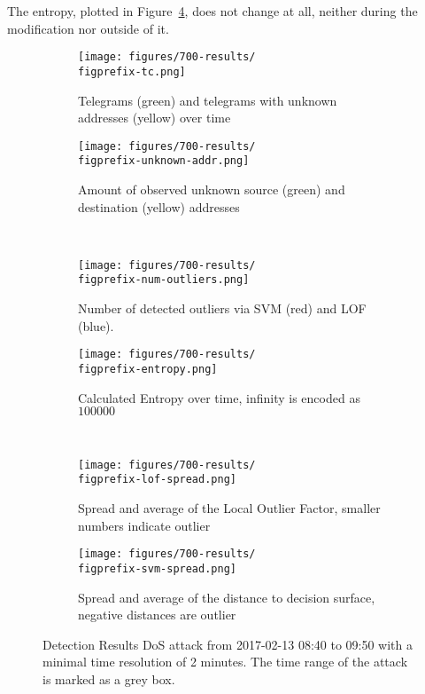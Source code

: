 The entropy, plotted in Figure~\ref{fig:results:dos:entropy}, does not change at all, neither during the modification nor outside of it.

\begin{figure}[H]
	\newcommand{\figwith}{0.49\textwidth}
	\newcommand{\figprefix}{dos}
	\centering
	
	\begin{subfigure}[b]{\figwith}
		\texttt{[image: figures/700-results/\\figprefix-tc.png]}
		\caption{Telegrams (green) and telegrams with unknown addresses (yellow) over time}
		\label{fig:results:\figprefix:tc}
	\end{subfigure}
	\hfil
	\begin{subfigure}[b]{\figwith}
		\texttt{[image: figures/700-results/\\figprefix-unknown-addr.png]}
		\caption{Amount of observed unknown source (green) and destination (yellow) addresses}
		\label{fig:results:\figprefix:addr}
	\end{subfigure}
	\\[1.5mm]
	\begin{subfigure}[b]{\figwith}
		\texttt{[image: figures/700-results/\\figprefix-num-outliers.png]}
		\caption{Number of detected outliers via SVM (red) and LOF (blue).}
		\label{fig:results:\figprefix:outlier}
	\end{subfigure}
	\hfil
	\begin{subfigure}[b]{\figwith}
		\texttt{[image: figures/700-results/\\figprefix-entropy.png]}
		\caption{Calculated Entropy over time, infinity is encoded as $100 000$}
		\label{fig:results:\figprefix:entropy}
	\end{subfigure}
	\\[1.5mm]
	\begin{subfigure}[b]{\figwith}
		\texttt{[image: figures/700-results/\\figprefix-lof-spread.png]}
		\caption{Spread and average of the Local Outlier Factor, smaller numbers indicate outlier}
		\label{fig:results:\figprefix:lof}
	\end{subfigure}
	\hfil
	\begin{subfigure}[b]{\figwith}
		\texttt{[image: figures/700-results/\\figprefix-svm-spread.png]}
		\caption{Spread and average of the distance to decision surface, negative distances are outlier}
		\label{fig:results:\figprefix:svm}
	\end{subfigure}
	
	\caption[Detection Results of a DoS]{Detection Results DoS attack from 2017-02-13 08:40 to 09:50 with a minimal time resolution of 2 minutes. The time range of the attack is marked as a grey box.}
	\label{fig:results:\figprefix}
	
\end{figure}

